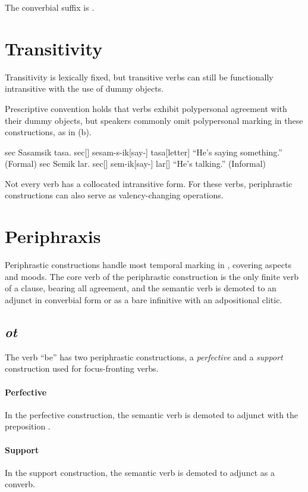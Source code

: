 The converbial suffix is .

\section{Transitivity}
Transitivity is lexically fixed, but transitive verbs can still be functionally intransitive with the use of dummy objects.

Prescriptive convention holds that verbs exhibit polypersonal agreement with their dummy objects, but speakers commonly omit polypersonal marking in these constructions, as in (\nextx b).

\pex
\a \begingl
\glpreamble sec Sasamsik tasa. \endpreamble
sec[]
sesam-s-ik[say-]
tasa[letter]
\glft “He's saying something.”
\trailingcitation (Formal)
\endgl
\a \begingl
\glpreamble sec Semik lar. \endpreamble
sec[]
sem-ik[say-]
lar[]
\glft “He's talking.”
\trailingcitation (Informal)
\endgl {}
\xe

Not every verb has a collocated intransitive form. For these verbs, periphrastic constructions can also serve as valency-changing operations.

\section{Periphraxis}
Periphrastic constructions handle most temporal marking in \langname{}, covering aspects and moods. The core verb of the periphrastic construction is the only finite verb of a clause, bearing all agreement, and the semantic verb is demoted to an adjunct in converbial form or as a bare infinitive with an adpositional clitic.

\subsection{\textit{ot}}
The verb  “be” has two periphrastic constructions, a \emph{perfective} and a \emph{support} construction used for focus-fronting verbs.

\paragraph{Perfective}
In the perfective construction, the semantic verb is demoted to adjunct with the preposition .

\paragraph{Support}
In the support construction, the semantic verb is demoted to adjunct as a converb.

